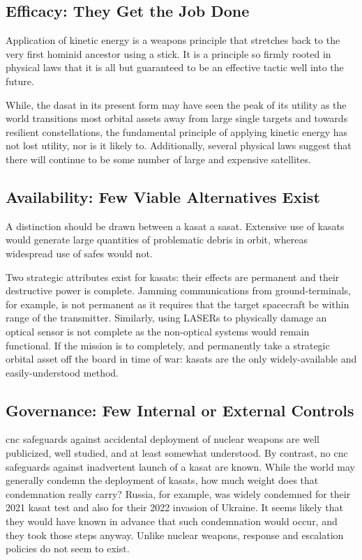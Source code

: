\subsection*{Efficacy: They Get the Job Done}

Application of kinetic energy is a weapons principle that stretches
back to the very first hominid ancestor using a stick.  It is a
principle so firmly rooted in physical laws that it is all but
guaranteed to be an effective tactic well into the future.

While, the \ac{dasat} in its present form may have seen the peak of
its utility as the world transitions most orbital assets away from
large single targets and towards resilient constellations, the
fundamental principle of applying kinetic energy has not lost utility,
nor is it likely to.  Additionally, several physical laws suggest that
there will continue to be some number of large and expensive
satellites.


\subsection*{Availability: Few Viable Alternatives Exist}

A distinction should be drawn between a \acf{kasat} a \acf{sasat}.
Extensive use of \acp{kasat} would generate large quantities of
problematic debris in orbit, whereas widespread use of \acp{safe}
would not.

Two strategic attributes exist for \acp{kasat}: their effects are
permanent and their destructive power is complete.  Jamming
communications from ground-terminals, for example, is not permanent as
it requires that the target spacecraft be within range of the
transmitter.  Similarly, using LASERs to physically damage an optical
sensor is not complete as the non-optical systems would remain
functional.  If the mission is to completely, and permanently take a
strategic orbital asset off the board in time of war: \acp{kasat} are
the only widely-available and easily-understood method.


\subsection*{Governance: Few Internal or External Controls}

\ac{cnc} safeguards against accidental deployment of nuclear weapons
are well publicized, well studied, and at least somewhat understood.
By contrast, no \ac{cnc} safeguards against inadvertent launch of a
\ac{kasat} are known.  While the world may generally condemn the
deployment of \acp{kasat}, how much weight does that condemnation
really carry?  Russia, for example, was widely condemned for their
2021 \ac{kasat} test and also for their 2022 invasion of Ukraine.  It
seems likely that they would have known in advance that such
condemnation would occur, and they took those steps anyway.  Unlike
nuclear weapons, response and escalation policies do not seem to
exist.


